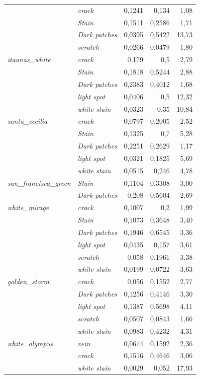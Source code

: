 \begin{table}[ht]
\begin{tabular}{llrrr}
     & \textit{crack} & 0,1241 & 0,134 & 1,08 \\
     & \textit{Stain} & 0,1511 & 0,2586 & 1,71 \\
     & \textit{Dark patches} & 0,0395 & 0,5422 & 13,73 \\
     & \textit{scratch} & 0,0266 & 0,0479 & 1,80 \\
    \textit{itaunas\_white} & \textit{crack} & 0,179 & 0,5 & 2,79 \\
     & \textit{Stain} & 0,1818 & 0,5244 & 2,88 \\
     & \textit{Dark patches} & 0,2383 & 0,4012 & 1,68 \\
     & \textit{light spot} & 0,0406 & 0,5 & 12,32 \\
     & \textit{white stain} & 0,0323 & 0,35 & 10,84 \\
    \textit{santa\_cecilia} & \textit{crack} & 0,0797 & 0,2005 & 2,52 \\
     & \textit{Stain} & 0,1325 & 0,7 & 5,28 \\
     & \textit{Dark patches} & 0,2251 & 0,2629 & 1,17 \\
     & \textit{light spot} & 0,0321 & 0,1825 & 5,69 \\
     & \textit{white stain} & 0,0515 & 0,246 & 4,78 \\
    \textit{san\_francisco\_green} & \textit{Stain} & 0,1104 & 0,3308 & 3,00 \\
     & \textit{Dark patches} & 0,208 & 0,5604 & 2,69 \\
    \textit{white\_mirage} & \textit{crack} & 0,1007 & 0,2 & 1,99 \\
     & \textit{Stain} & 0,1073 & 0,3648 & 3,40 \\
     & \textit{Dark patches} & 0,1946 & 0,6545 & 3,36 \\
     & \textit{light spot} & 0,0435 & 0,157 & 3,61 \\
     & \textit{scratch} & 0,058 & 0,1961 & 3,38 \\
     & \textit{white stain} & 0,0199 & 0,0722 & 3,63 \\
    \textit{golden\_storm} & \textit{crack} & 0,056 & 0,1552 & 2,77 \\
     & \textit{Dark patches} & 0,1256 & 0,4146 & 3,30 \\
     & \textit{light spot} & 0,1387 & 0,5698 & 4,11 \\
     & \textit{scratch} & 0,0507 & 0,0843 & 1,66 \\
     & \textit{white stain} & 0,0983 & 0,4232 & 4,31 \\
    \textit{white\_olympus} & \textit{vein} & 0,0674 & 0,1592 & 2,36 \\
     & \textit{crack} & 0,1516 & 0,4646 & 3,06 \\
     & \textit{white stain} & 0,0029 & 0,052 & 17,93 \\
    \hline
  \end{tabular}
\end{table}
